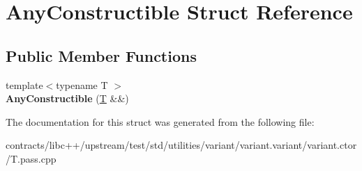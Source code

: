 \hypertarget{struct_any_constructible}{}\section{Any\+Constructible Struct Reference}
\label{struct_any_constructible}
\subsection*{Public Member Functions}
\begin{DoxyCompactItemize}
\item 
\mbox{\label{struct_any_constructible_ab609307a1d2f74ebc2373a6aab888e7a}} 
{\footnotesize template$<$typename T $>$ }\\{\bfseries Any\+Constructible} (\mbox{\hyperlink{struct_t}{T}} \&\&)
\end{DoxyCompactItemize}


The documentation for this struct was generated from the following file\+:\begin{DoxyCompactItemize}
\item 
contracts/libc++/upstream/test/std/utilities/variant/variant.\+variant/variant.\+ctor/T.\+pass.\+cpp\end{DoxyCompactItemize}
